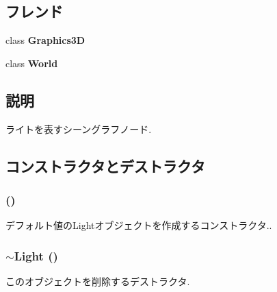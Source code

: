 \subsection*{フレンド}
\begin{CompactItemize}
\item 
\hypertarget{classm3g_1_1Light_8174d4c629550c1ee279571250236ef4}{
class \textbf{Graphics3D}}
\label{classm3g_1_1Light_8174d4c629550c1ee279571250236ef4}

\item 
\hypertarget{classm3g_1_1Light_7b4bcdf992c21ae83363f25df05b1d25}{
class \textbf{World}}
\label{classm3g_1_1Light_7b4bcdf992c21ae83363f25df05b1d25}

\end{CompactItemize}


\subsection{説明}
ライトを表すシーングラフノード. 

\subsection{コンストラクタとデストラクタ}
\hypertarget{classm3g_1_1Light_7f8a7be05225f470c200f7e4ff914a3c}{
\subsubsection[{Light}]{ ()}}
\label{classm3g_1_1Light_7f8a7be05225f470c200f7e4ff914a3c}


デフォルト値のLightオブジェクトを作成するコンストラクタ.. \hypertarget{classm3g_1_1Light_f50d3d8cdb323e1a9fbd7bfac3aeba06}{
\subsubsection[{$\sim$Light}]{\setlength{\rightskip}{0pt plus 5cm}$\sim${\bf Light} ()}}
\label{classm3g_1_1Light_f50d3d8cdb323e1a9fbd7bfac3aeba06}


このオブジェクトを削除するデストラクタ. 

